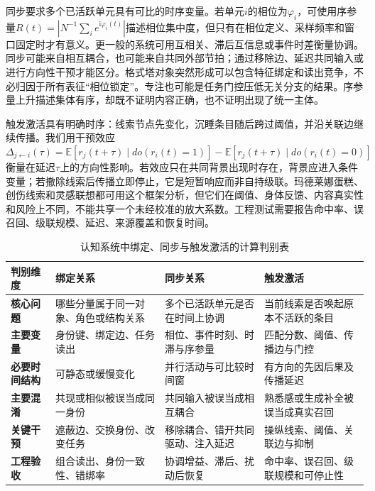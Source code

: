 同步要求多个已活跃单元具有可比的时序变量。若单元$i$的相位为$\varphi_i$，可使用序参量$R(t)=\left|N^{-1}\sum_i e^{\mathrm i\varphi_i(t)}\right|$描述相位集中度，但只有在相位定义、采样频率和窗口固定时才有意义。更一般的系统可用互相关、滞后互信息或事件时差衡量协调。同步可能来自相互耦合，也可能来自共同外部节拍；通过移除边、延迟共同输入或进行方向性干预才能区分。格式塔对象突然形成可以包含特征绑定和读出竞争，不必归因于所有表征“相位锁定”。专注也可能是任务门控压低无关分支的结果。序参量上升描述集体有序，却既不证明内容正确，也不证明出现了统一主体。

触发激活具有明确时序：线索节点先变化，沉睡条目随后跨过阈值，并沿关联边继续传播。我们用干预效应$\Delta_{j\leftarrow i}(\tau)=\mathbb E[r_j(t+\tau)\mid do(r_i(t)=1)]-\mathbb E[r_j(t+\tau)\mid do(r_i(t)=0)]$衡量在延迟$\tau$上的方向性影响。若效应只在共同背景出现时存在，背景应进入条件变量；若撤除线索后传播立即停止，它是短暂响应而非自持级联。玛德莱娜蛋糕、创伤线索和灵感联想都可用这个框架分析，但它们在阈值、身体反馈、内容真实性和风险上不同，不能共享一个未经校准的放大系数。工程测试需要报告命中率、误召回、级联规模、延迟、来源覆盖和恢复时间。

\begin{table}[htbp]
\centering
\footnotesize
\renewcommand{\arraystretch}{1.35}
\begin{tabularx}{\textwidth}{l|X|X|X}
\toprule
\rowcolor{structurecolor!20} \textbf{判别维度} & \textbf{绑定关系} & \textbf{同步关系} & \textbf{触发激活} \\
\midrule
\textbf{核心问题} & 哪些分量属于同一对象、角色或结构关系 & 多个已活跃单元是否在时间上协调 & 当前线索是否唤起原本不活跃的条目 \\
\hline
\textbf{主要变量} & 身份键、绑定边、任务读出 & 相位、事件时刻、时滞与序参量 & 匹配分数、阈值、传播边与门控 \\
\hline
\textbf{必要时间结构} & 可静态或缓慢变化 & 并行活动与可比较时间窗 & 有方向的先因后果及传播延迟 \\
\hline
\textbf{主要混淆} & 共现或相似被误当成同一身份 & 共同输入被误当成相互耦合 & 熟悉感或生成补全被误当成真实召回 \\
\hline
\textbf{关键干预} & 遮蔽边、交换身份、改变任务 & 移除耦合、错开共同驱动、注入延迟 & 操纵线索、阈值、关联边与抑制 \\
\hline
\textbf{工程验收} & 组合读出、身份一致性、错绑率 & 协调增益、滞后、扰动后恢复 & 命中率、误召回、级联规模和可停止性 \\
\bottomrule
\end{tabularx}
\caption{认知系统中绑定、同步与触发激活的计算判别表}
\label{tab:interaction_magic}
\end{table}

